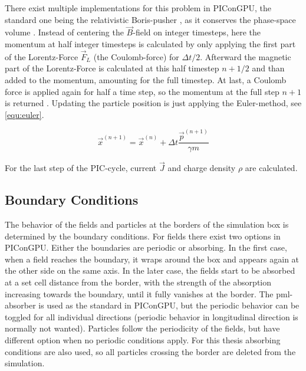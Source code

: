 \documentclass[bachelor_thesis]{subfiles}
\begin{document}
There exist multiple implementations for this problem in PIConGPU, the standard one being the relativistic Boris-pusher \cite{Boris1970}, as it conserves the phase-space volume \cite{PICRepo}. Instead of centering the $\vec{B}$-field on integer timesteps, here the momentum at half integer timesteps is
calculated by only applying the first part of the Lorentz-Force $\vec{F}_L$ (the Coulomb-force) for $\Delta t/2$. Afterward the magnetic part of the Lorentz-Force is calculated at this half timestep $n+1/2$ and than added to the momentum, amounting for the full timestep.
At last, a Coulomb force is applied again for half a time step, so the momentum at the full step $n+1$ is returned \cite{Zenitani2018, Pausch2019}. Updating the particle position is just applying the Euler-method, see \autoref{equ:euler}.

\begin{equation}
	\vec{x}^{(n+1)} = \vec{x}^{(n)} + \Delta t \frac{\vec{p}^{(n+1)}}{\gamma m}
	\label{equ:euler}
\end{equation}

For the last step of the PIC-cycle, current $\vec{J}$ and charge density $\rho$ are calculated. 

\subsection{Boundary Conditions}
The behavior of the fields and particles at the borders of the simulation box is determined by the boundary conditions.
For fields there exist two options in PIConGPU. Either the boundaries are periodic or absorbing. In the first case, when a field reaches the boundary, it wraps around the box and appears again at the other side on the same axis.
In the later case, the fields start to be absorbed at a set cell distance from the border, with the strength of the absorption increasing towards the boundary, until it fully vanishes at the border.
The \gls{pml}-absorber is used as the standard in PIConGPU, but the periodic behavior can be toggled for all individual directions (periodic behavior in longitudinal direction is normally not wanted).
Particles follow the periodicity of the fields, but have different option when no periodic conditions apply. For this thesis absorbing conditions are also used, so all particles crossing the border are deleted from the simulation.
\end{document}
